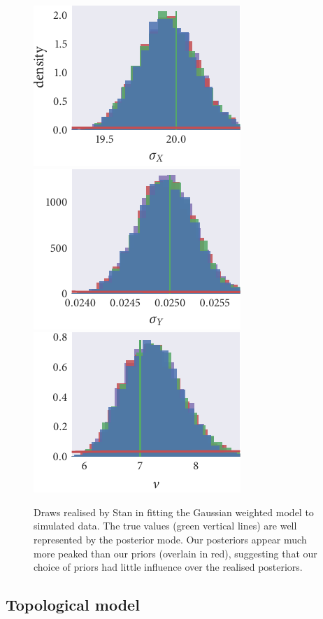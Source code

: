 \begin{figure}[tbp]
  \includegraphics{gauss/gauss_hist_sigma_X.pdf}%
  \includegraphics{gauss/gauss_hist_sigma_Y.pdf}%
  \includegraphics{gauss/gauss_hist_nu.pdf}
  \caption{Draws realised by Stan in fitting the Gaussian weighted model to
    simulated data. The true values (green vertical lines) are well
    represented by the posterior mode. Our posteriors appear much more peaked
    than our priors (overlain in red), suggesting that our choice of priors
    had little influence over the realised posteriors.}
  \label{fig:gauss_hist}
\end{figure}

\subsection{Topological model}

